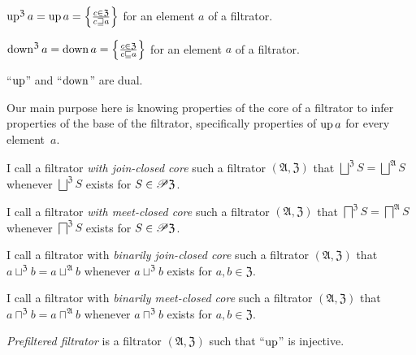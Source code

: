 \begin{defn}
$\operatorname{up}^{\mathfrak{Z}}a=\operatorname{up} a=\left\{ \frac{c\in\mathfrak{Z}}{c\sqsupseteq a}\right\}$
for an element $a$ of a filtrator.
\end{defn}

\begin{defn}
$\operatorname{down}^{\mathfrak{Z}}a=\operatorname{down} a=\left\{ \frac{c\in\mathfrak{Z}}{c\sqsubseteq a}\right\}$
for an element $a$ of a filtrator.\end{defn}
\begin{obvious}
``$\operatorname{up}$'' and ``$\operatorname{down}$'' are dual.
\end{obvious}
Our main purpose here is knowing properties of the core of a filtrator
to infer properties of the base of the filtrator, specifically properties
of $\operatorname{up} a$ for every element~$a$.
\begin{defn}
I call a filtrator \emph{with
join-closed core} such a filtrator $(\mathfrak{A},\mathfrak{Z})$
that $\bigsqcup^{\mathfrak{Z}}S=\bigsqcup^{\mathfrak{A}}S$ whenever
$\bigsqcup^{\mathfrak{Z}}S$ exists for $S\in\mathscr{P}\mathfrak{Z}$.
\end{defn}

\begin{defn}
I call a filtrator \emph{with
meet-closed core} such a filtrator $(\mathfrak{A},\mathfrak{Z})$
that $\bigsqcap^{\mathfrak{Z}}S=\bigsqcap^{\mathfrak{A}}S$ whenever
$\bigsqcap^{\mathfrak{Z}}S$ exists for $S\in\mathscr{P}\mathfrak{Z}$.
\end{defn}

\begin{defn}
I call a filtrator
with \emph{binarily join-closed core} such a filtrator $(\mathfrak{A},\mathfrak{Z})$
that $a\sqcup^{\mathfrak{Z}}b=a\sqcup^{\mathfrak{A}}b$ whenever $a\sqcup^{\mathfrak{Z}}b$
exists for $a,b\in\mathfrak{Z}$.
\end{defn}

\begin{defn}
I call a filtrator
with \emph{binarily meet-closed core} such a filtrator $(\mathfrak{A},\mathfrak{Z})$
that $a\sqcap^{\mathfrak{Z}}b=a\sqcap^{\mathfrak{A}}b$ whenever
$a\sqcap^{\mathfrak{Z}}b$ exists for $a,b\in\mathfrak{Z}$.
\end{defn}

\begin{defn}
\emph{Prefiltered filtrator} is a filtrator
$(\mathfrak{A},\mathfrak{Z})$ such that ``$\operatorname{up}$'' is injective.
\end{defn}

